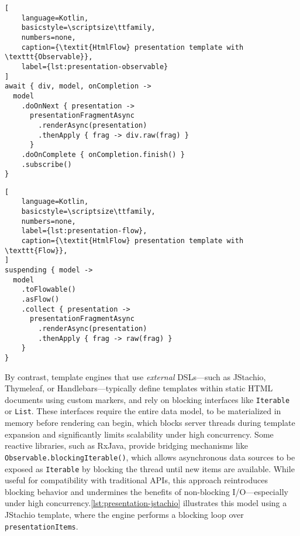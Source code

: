 \begin{center}
\begin{minipage}{0.50\textwidth}
\begin{lstlisting}[
    language=Kotlin,
    basicstyle=\scriptsize\ttfamily,
    numbers=none,
    caption={\textit{HtmlFlow} presentation template with \texttt{Observable}},
    label={lst:presentation-observable}
]
await { div, model, onCompletion ->
  model
    .doOnNext { presentation ->
      presentationFragmentAsync
        .renderAsync(presentation)
        .thenApply { frag -> div.raw(frag) }
      }
    .doOnComplete { onCompletion.finish() }
    .subscribe()
}
\end{lstlisting}
\end{minipage}
\hfill
\begin{minipage}{0.46\textwidth}
\begin{lstlisting}[
    language=Kotlin,
    basicstyle=\scriptsize\ttfamily,
    numbers=none,
    label={lst:presentation-flow},
    caption={\textit{HtmlFlow} presentation template with \texttt{Flow}},
]
suspending { model ->
  model
    .toFlowable()
    .asFlow()
    .collect { presentation ->
      presentationFragmentAsync
        .renderAsync(presentation)
        .thenApply { frag -> raw(frag) }
    }
}
\end{lstlisting}
\end{minipage}
\end{center}

By contrast, template engines that use \textit{external} DSLs—such as JStachio,
Thymeleaf, or Handlebars—typically define templates within static HTML
documents using custom markers, and rely on blocking interfaces like
\texttt{Iterable} or \texttt{List}. These interfaces require the entire data
model, to be materialized in memory before rendering can begin, which blocks server
threads during template expansion and significantly limits scalability under
high concurrency.
Some reactive libraries, such as RxJava, provide bridging mechanisms like
\texttt{Observable.blockingIterable()}, which allows asynchronous data sources
to be exposed as \texttt{Iterable} by blocking the thread until new items are available.
While useful for compatibility with traditional APIs, this approach
reintroduces blocking behavior and undermines the benefits of non-blocking
I/O—especially under high concurrency.\autoref{lst:presentation-jstachio}
illustrates this model using a JStachio template, where the engine performs a
blocking loop over \texttt{presentationItems}.

